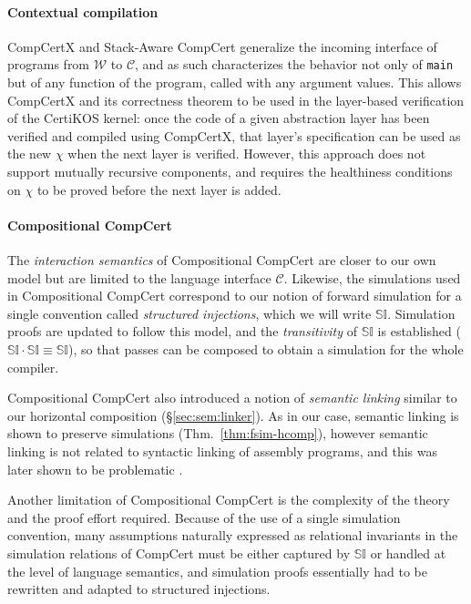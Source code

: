\documentclass[sigplan,10pt,review]{acmart}
\begin{document}
\paragraph{Contextual compilation} %

CompCertX \cite{popl15} and
Stack-Aware CompCert \cite{stackaware}
generalize
the incoming interface of programs
from $\mathcal{W}$ to $\mathcal{C}$,
and as such characterizes the behavior
not only of \texttt{main}
but of any function of the program,
called with any argument values.
This allows CompCertX and its correctness theorem
to be used in the layer-based verification of
the CertiKOS kernel:
once the code of a given abstraction layer has been verified
and compiled using CompCertX,
that layer's specification can be used as the new $\chi$
when the next layer is verified.
However,
this approach does not support
mutually recursive components,
and requires the healthiness conditions on $\chi$
to be proved before the next layer is added.


\paragraph{Compositional CompCert} %

The \emph{interaction semantics} of
Compositional CompCert \cite{compcompcert}
are closer to our own model
but are limited to the language interface $\mathcal{C}$.
Likewise, the simulations used in Compositional CompCert
correspond to our notion of forward simulation
for a single convention called \emph{structured injections},
which we will write $\mathbb{SI}$.
Simulation proofs are updated to follow this model,
and the \emph{transitivity} of $\mathbb{SI}$ is established
($\mathbb{SI} \cdot \mathbb{SI} \equiv \mathbb{SI}$),
so that passes can be composed
to obtain a simulation for the whole compiler.

Compositional CompCert also introduced a notion of \emph{semantic linking}
similar to our horizontal composition
(\S\ref{sec:sem:linker}).
As in our case,
semantic linking is shown to preserve simulations
(Thm.~\ref{thm:fsim-hcomp}),
however semantic linking is not related to
syntactic linking of assembly programs,
and this was later shown to be problematic \cite{compcertm}.

Another limitation of Compositional CompCert
is the complexity of the theory
and the proof effort required.
Because of the use of a single simulation convention,
many assumptions naturally expressed as
relational invariants in the simulation relations of CompCert
must be either captured by $\mathbb{SI}$
or handled at the level of language semantics,
and simulation proofs
essentially had to be rewritten and adapted to
structured injections.
\end{document}
